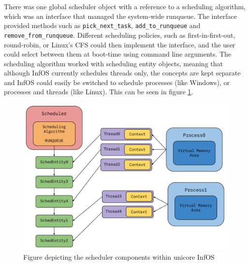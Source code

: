 \documentclass[bsc,frontabs,singlespacing,parskip,deptreport]{infthesis}
\begin{document}
There was one global scheduler object with a reference to a scheduling algorithm, which was an interface that managed the system-wide runqueue. The interface provided methods such as \texttt{pick\_next\_task}, \texttt{add\_to\_runqueue} and \texttt{remove\_from\_runqueue}. Different scheduling policies, such as first-in-first-out, round-robin, or Linux's CFS could then implement the interface, and the user could select between them at boot-time using command line arguments. The scheduling algorithm worked with scheduling entity objects, meaning that although InfOS currently schedules threads only, the concepts are kept separate and InfOS could easily be switched to schedule processes (like Windows), or processes and threads (like Linux). This can be seen in figure \ref{schedulers}.

\begin{figure}[h]
    \centering
    \includegraphics[scale=0.7]{figures/schedulers.pdf}
    \caption{Figure depicting the scheduler components within unicore InfOS}
    \label{schedulers}
\end{figure}
\end{document}
